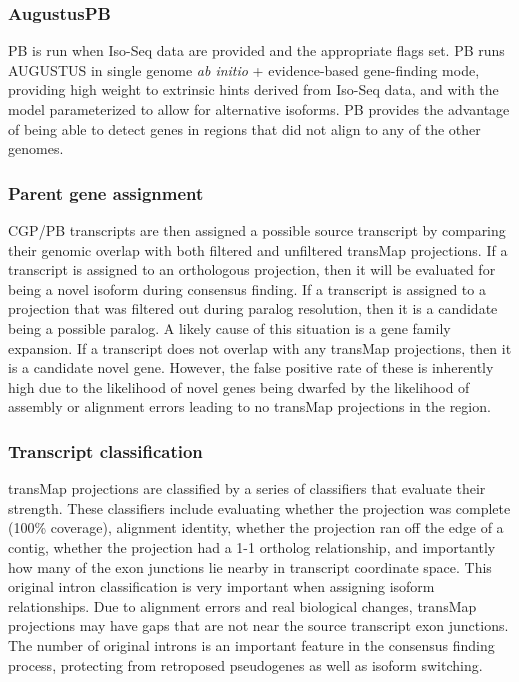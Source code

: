 \subsubsection*{AugustusPB}
	PB is run when Iso-Seq data are provided and the appropriate flags set. PB runs AUGUSTUS in single genome \textit{ab initio} + evidence-based gene-finding mode, providing high weight to extrinsic hints derived from Iso-Seq data, and with the model parameterized to allow for alternative isoforms. PB provides the advantage of being able to detect genes in regions that did not align to any of the other genomes.
  
\subsubsection*{Parent gene assignment}
CGP/PB transcripts are then assigned a possible source transcript by comparing their genomic overlap with both filtered and unfiltered transMap projections. If a transcript is assigned to an orthologous projection, then it will be evaluated for being a novel isoform during consensus finding. If a transcript is assigned to a projection that was filtered out during paralog resolution, then it is a candidate being a possible paralog. A likely cause of this situation is a gene family expansion. If a transcript does not overlap with any transMap projections, then it is a candidate novel gene. However, the false positive rate of these is inherently high due to the likelihood of novel genes being dwarfed by the likelihood of assembly or alignment errors leading to no transMap projections in the region.

\subsubsection*{Transcript classification}
	transMap projections are classified by a series of classifiers that evaluate their strength. These classifiers include evaluating whether the projection was complete (100\% coverage), alignment identity, whether the projection ran off the edge of a contig, whether the projection had a 1-1 ortholog relationship, and importantly how many of the exon junctions lie nearby in transcript coordinate space. This original intron classification is very important when assigning isoform relationships. Due to alignment errors and real biological changes, transMap projections may have gaps that are not near the source transcript exon junctions. The number of original introns is an important feature in the consensus finding process, protecting from retroposed pseudogenes as well as isoform switching.
  
